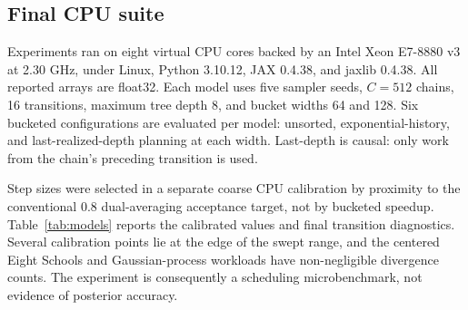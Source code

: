 \documentclass[conference]{IEEEtran}
\begin{document}
\subsection{Final CPU suite}

Experiments ran on eight virtual CPU cores backed by an Intel Xeon E7-8880 v3
at 2.30 GHz, under Linux, Python 3.10.12, JAX 0.4.38, and jaxlib 0.4.38.  All
reported arrays are float32.  Each model uses five sampler seeds, $C=512$
chains, 16 transitions, maximum tree depth 8, and bucket widths 64 and 128.  Six
bucketed configurations are evaluated per model: unsorted, exponential-history,
and last-realized-depth planning at each width.  Last-depth is causal: only work
from the chain's preceding transition is used.

Step sizes were selected in a separate coarse CPU calibration by proximity to
the conventional 0.8 dual-averaging acceptance target, not by bucketed
speedup.  Table~\ref{tab:models} reports the calibrated values and final
transition diagnostics.  Several calibration points lie at the edge of the
swept range, and the centered Eight Schools and Gaussian-process workloads have
non-negligible divergence counts.  The experiment is consequently a scheduling
microbenchmark, not evidence of posterior accuracy.

\begin{table}[t]
\centering
\caption{Acceptance-calibrated CPU workloads.  Warm time and divergences are
medians over five sampler seeds; divergence ranges appear in brackets.  Each
seed contains $512\times16=8192$ transitions, and discrete metrics match every
bucketed configuration.}
\label{tab:models}
\small
{}
\end{table}
\end{document}
